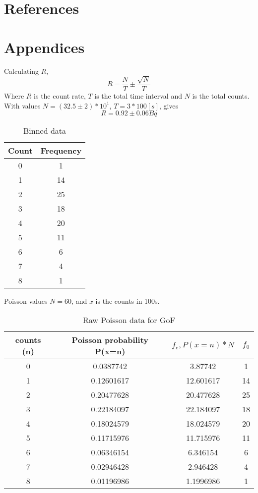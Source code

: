 \documentclass[11pt]{article}
\begin{document}
    \section{References}
 
    \section{Appendices}
    Calculating $R$, $$ R = \frac{N}{T} \pm \frac{\sqrt{N}}{T}$$
  Where $R$ is the count rate, $T$ is the total time interval and $N$ is the total counts. With values $N =( 32.5 \pm 2) * 10^{1}$, $T= 3 * 100 [s]$, gives 
  $$R = 0.92 \pm 0.06  Bq$$ 
    \begin{table}[h]
        \centering
        \begin{tabular}{|c|c|}
        \hline
          \textbf{Count}  & \textbf{Frequency} \\
          \hline
           0  & 1 \\
           1 & 14\\
           2  & 25 \\
           3  & 18 \\
           4  & 20 \\
           5  & 11 \\
           6  & 6\\
           7  & 4 \\
           8  & 1 \\
           \hline
        \end{tabular}
        \caption{Binned data}
        \label{tab:my_label}
    \end{table}
    Poisson values 
    $N = 60$, and $x$ is the counts in 100s. 
    \begin{table}[h]
        \centering
        \begin{tabular}{|c|c|c|c|}
         \hline
           counts (n)  & Poisson probability P(x=n) & $ f_{e}, P(x=n) * N$ & $f_{0}$ \\
            \hline
            0 & 0.0387742 & 3.87742 & 1 \\
            1 & 0.12601617 & 12.601617 & 14\\
            2 & 0.20477628 & 20.477628 & 25\\
            3 & 0.22184097 & 22.184097 & 18\\
            4 & 0.18024579 & 18.024579 & 20\\
            5 & 0.11715976 & 11.715976 & 11\\
            6 & 0.06346154 & 6.346154 & 6 \\
            7 & 0.02946428 & 2.946428 & 4\\
            8 & 0.01196986 & 1.1996986 & 1\\
             \hline
        \end{tabular}
        \caption{Raw Poisson data for GoF}
        \label{tab:my_label}
    \end{table}
\end{document}
